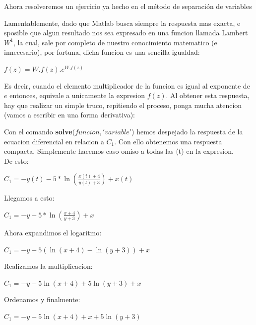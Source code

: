 \documentclass[10pt,a4paper]{article}
\begin{document}
Ahora resolveremos un ejercicio ya hecho en el método de separación de variables














Lamentablemente, dado que Matlab busca siempre la respuesta mas exacta, e sposible que algun resultado nos sea expresado en una funcion llamada Lambert $W^1$, la cual, sale por completo de nuestro conocimiento matematico (e innecesario), por fortuna, dicha funcion es una sencilla igualdad:

\begin{center}
$f(z)=W.f(z).e^{W.f(z)}$
\end{center}

Es decir, cuando el elemento multiplicador de la funcion es igual al exponente de $e$ entonces, equivale a unicamente la expresion $f(z)$. Al obtener esta respuesta, hay que realizar un simple truco, repitiendo el proceso, ponga mucha atencion (vamos a escribir en una forma derivativa):










Con el comando {\bf solve}($funcion,'variable'$) hemos despejado la respuesta de la ecuacion diferencial en relacion a $C_1$. Con ello obtenemos una respuesta compacta. Simplemente hacemos caso omiso a todas las (t) en la expresion.
\\
De esto:
\begin{center}
$C_1=-y(t)-5*\ln (\frac{x(t)+4}{y(t)+3})+x(t)$
\end{center}

Llegamos a esto:
\begin{center}
$C_1=-y-5*\ln (\frac{x+4}{y+3})+x$
\end{center}

Ahora expandimos el logaritmo:
\begin{center}
$C_1=-y-5(\ln(x+4)-\ln(y+3))+x$
\end{center}

Realizamos la multiplicacion:
\begin{center}
$C_1=-y-5\ln(x+4)+5\ln(y+3)+x$
\end{center}
  
Ordenamos y finalmente:
\begin{center}
$C_1=-y-5\ln(x+4)+x+5\ln(y+3)$
\end{center}
 
\end{document}
